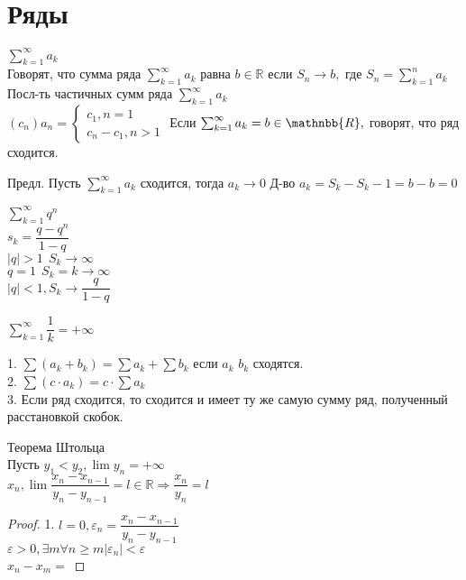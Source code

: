 \section{Ряды}

\begin{definition}
	$ \sum_{k=1}^{\infty} a_k $\\
	Говорят, что сумма ряда $  \sum_{k=1}^{\infty} a_k $ равна  $ b \in \mathbb{R} $ если $ S_n \rightarrow b, $ где $ S_n =  \sum_{k=1}^{n} a_k$
	Посл-ть частичных сумм ряда $  \sum_{k=1}^{\infty} a_k$ \\
	$ (c_n) a_n = \left\{ \begin{matrix}
		c_1, n = 1 \\
		c_n - c_1, n > 1 
	\end{matrix} \right. $ 
	Если $  \sum_{k=1}^{\infty} a_k = b \in \mathnbb{R}, $ говорят, что ряд сходится.
\end{definition}
Предл. Пусть $  \sum_{k=1}^{\infty} a_k $ сходится, тогда $ a_k \rightarrow 0 $ 
Д-во $ a_k = S_k - S_k-1 = b - b = 0$\\
\begin{example}
	 $ \sum_{k=1}^{\infty} q^n $\\
	 $ s_k = \dfrac{q - q^n}{1 - q} $ \\
	 $ |q | > 1\ \ S_k \rightarrow \infty $ \\
	 $ q = 1 \ \ S_k = k \rightarrow \infty $ \\
	 $ | q | < 1, S_k \rightarrow \dfrac{q}{1- q} $ \\
\end{example}
\begin{example}
	$  \sum_{k=1}^{\infty} \dfrac{1}{k} = +\infty $ \\
\end{example}
\begin{properties}
	1. $ \sum(a_k + b_k) = \sum a_k + \sum b_k $ если $a_k $ $ b_k $ сходятся.\\
	2. $ \sum (c \cdot a_k ) = c \cdot \sum a_k $ \\
	3. Если ряд сходится, то сходится и имеет ту же самую сумму ряд, полученный расстановкой скобок. \\
	
\end{properties}
\begin{theorem} Теорема Штольца \\
	Пусть $ y_1 < y_2, \lim y_n =  +\infty $ \\
	$ x_n, \lim \dfrac{x_n - x_{n-1}}{y_n - y_{n-1}} = l \in \mathbb{R} \Rightarrow \dfrac{x_n}{y_n} = l $
	\begin{proof}
		1. $ l = 0, \varepsilon_n = \dfrac{x_n - x_{n-1}}{y_n - y_{n-1}} $ \\
		$ \varepsilon > 0, \exists m \forall n \geq m |\varepsilon_n | < \varepsilon $ \\
		$ x_n - x_m = $
	\end{proof}
\end{theorem}
